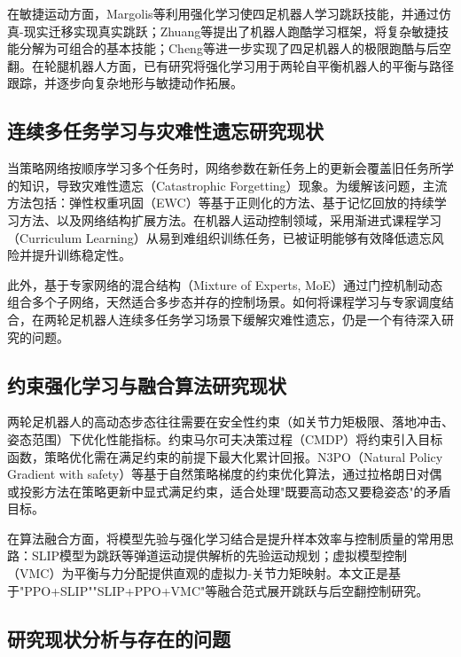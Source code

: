 在敏捷运动方面，Margolis等\cite{margolis2022}利用强化学习使四足机器人学习跳跃技能，并通过仿真-现实迁移实现真实跳跃；Zhuang等\cite{zhuang2023}提出了机器人跑酷学习框架，将复杂敏捷技能分解为可组合的基本技能；Cheng等\cite{cheng2024}进一步实现了四足机器人的极限跑酷与后空翻。在轮腿机器人方面，已有研究将强化学习用于两轮自平衡机器人的平衡与路径跟踪\cite{klemm2019}，并逐步向复杂地形与敏捷动作拓展。

\subsection{连续多任务学习与灾难性遗忘研究现状}

当策略网络按顺序学习多个任务时，网络参数在新任务上的更新会覆盖旧任务所学的知识，导致灾难性遗忘（Catastrophic Forgetting）现象\cite{mccloskey1989}。为缓解该问题，主流方法包括：弹性权重巩固（EWC）等基于正则化的方法\cite{kirkpatrick2017}、基于记忆回放的持续学习方法、以及网络结构扩展方法。在机器人运动控制领域，采用渐进式课程学习（Curriculum Learning）从易到难组织训练任务，已被证明能够有效降低遗忘风险并提升训练稳定性\cite{bengio2009}。

此外，基于专家网络的混合结构（Mixture of Experts, MoE）通过门控机制动态组合多个子网络，天然适合多步态并存的控制场景\cite{jacobs1991,shazeer2017}。如何将课程学习与专家调度结合，在两轮足机器人连续多任务学习场景下缓解灾难性遗忘，仍是一个有待深入研究的问题。

\subsection{约束强化学习与融合算法研究现状}

两轮足机器人的高动态步态往往需要在安全性约束（如关节力矩极限、落地冲击、姿态范围）下优化性能指标。约束马尔可夫决策过程（CMDP）将约束引入目标函数，策略优化需在满足约束的前提下最大化累计回报\cite{cpo2017}。N3PO（Natural Policy Gradient with safety）等基于自然策略梯度的约束优化算法，通过拉格朗日对偶或投影方法在策略更新中显式满足约束，适合处理"既要高动态又要稳姿态"的矛盾目标\cite{npg2001}。

在算法融合方面，将模型先验与强化学习结合是提升样本效率与控制质量的常用思路：SLIP模型为跳跃等弹道运动提供解析的先验运动规划\cite{blickhan1989,geyer2006}；虚拟模型控制（VMC）为平衡与力分配提供直观的虚拟力-关节力矩映射\cite{pratt2001}。本文正是基于"PPO+SLIP""SLIP+PPO+VMC"等融合范式展开跳跃与后空翻控制研究。

\subsection{研究现状分析与存在的问题}

